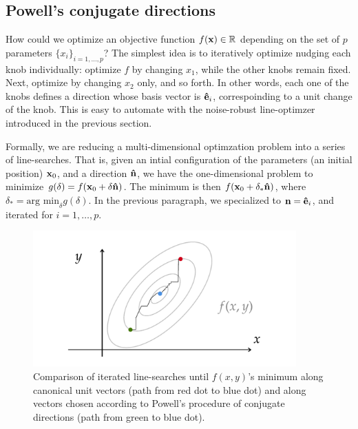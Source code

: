 \subsection{Powell's conjugate directions}
How could we optimize an objective function $f(\vb{x})\in\mathbb{R}$ depending on the set of $p$ parameters $\{x_i\}_{i=1,\dots,p}$? The simplest idea is to iteratively optimize nudging each knob individually: optimize $f$ by changing $x_1$, while the other knobs remain fixed. Next, optimize by changing $x_2$ only, and so forth. In other words, each one of the knobs defines a direction whose basis vector is $\vu{e}_i$, correspoinding to a unit change of the knob. This is easy to automate with the noise-robust line-optimzer introduced in the previous section.

Formally, we are reducing a multi-dimensional optimzation problem into a series of line-searches. That is, given an intial configuration of the parameters (an initial position) $\vb{x}_0$, and a direction $\vu{n}$, we have the one-dimensional problem to minimize $g(\delta)=f(\vb{x}_0 + \delta \vu{n})$. The minimum is  then $f(\vb{x}_0 + \delta_* \vu{n})$, where $\delta_* = \text{arg min}_\delta g(\delta)$. In the previous paragraph, we specialized to $\vb{n}=\vu{e}_i$, and iterated for $i=1,\dots, p$.

\begin{figure}[htb]
    \centering
    \includegraphics[width=0.9\textwidth]{Images/powell_loop.pdf}
    \caption{Comparison of iterated line-searches until $f(x,y)$'s minimum along canonical unit vectors (path from red dot to blue dot) and along vectors chosen according to Powell's procedure of conjugate directions (path from green to blue dot).}
\end{figure}

